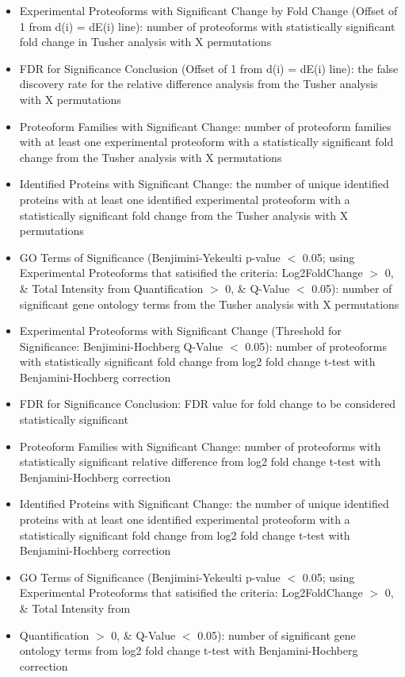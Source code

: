 \begin{itemize}
\begin{itemize}
\item Experimental Proteoforms with Significant Change by Fold Change (Offset of 1 from d(i) = dE(i) line): number of proteoforms with statistically significant fold change in Tusher analysis with X permutations
\item FDR for Significance Conclusion (Offset of 1 from d(i) = dE(i) line): the false discovery rate for the relative difference analysis from the Tusher analysis with X permutations
\item Proteoform Families with Significant Change: number of proteoform families with at least one experimental proteoform with a statistically significant fold change from the Tusher analysis with X permutations
\item Identified Proteins with Significant Change: the number of unique identified proteins with at least one identified experimental proteoform with a statistically significant fold change from the Tusher analysis with X permutations
\item GO Terms of Significance (Benjimini-Yekeulti p-value $<$ 0.05; using Experimental Proteoforms that satisified the criteria:  Log2FoldChange $>$ 0, \& Total Intensity from Quantification $>$ 0, \& Q-Value $<$ 0.05): number of significant gene ontology terms from the Tusher analysis with X permutations
\item Experimental Proteoforms with Significant Change (Threshold for Significance: Benjimini-Hochberg Q-Value $<$ 0.05): number of proteoforms with statistically significant fold change from log2 fold change t-test with Benjamini-Hochberg correction
\item FDR for Significance Conclusion: FDR value for fold change to be considered statistically significant
\item Proteoform Families with Significant Change: number of proteoforms with statistically significant  relative difference from log2 fold change t-test with Benjamini-Hochberg correction
\item Identified Proteins with Significant Change: the number of unique identified proteins with at least one identified experimental proteoform with a statistically significant fold change from log2 fold change t-test with Benjamini-Hochberg correction
\item GO Terms of Significance (Benjimini-Yekeulti p-value $<$ 0.05; using Experimental Proteoforms that satisified the criteria:  Log2FoldChange $>$ 0, \& Total Intensity from 
\item Quantification $>$ 0, \& Q-Value $<$ 0.05): number of significant gene ontology terms from log2 fold change t-test with Benjamini-Hochberg correction

\end{itemize}
\end{itemize}
